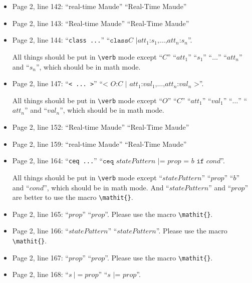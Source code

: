 \documentclass[12pt,onecolumn]{IEEEtranTIE}
\begin{document}
\begin{itemize}
\item Page 2, line 142: ``real-time Maude'' \by ``Real-Time Maude''

\item Page 2, line 143: ``Real-time Maude'' \by ``Real-Time Maude''

\item Page 2, line 144: ``\verb|class ...|'' \by ``$\texttt{class
}C\texttt{ |
}att_1\texttt{:}s_1\texttt{,}\ldots\texttt{,}att_n\texttt{:}s_n$''.

All things should be put in \verb|\verb| mode except ``$C$''
``$att_1$'' ``$s_1$'' ``$\ldots$'' ``$att_n$'' and ``$s_n$'', which
should be in math mode.

\item Page 2, line 147: ``\verb|< ... >|'' \by ``$\texttt{< }
  O\texttt{:} C \texttt{ | } att_1\texttt{:}val_1\texttt{,} \ldots
  \texttt{,}att_n\texttt{:}val_n\texttt{ >}$''. 

All things should be put in \verb|\verb| mode except ``$O$'' ``$C$''
``$att_1$'' ``$val_1$'' ``$\ldots$'' ``$att_n$'' and ``$val_n$'',
which should be in math mode.

\item Page 2, line 152: ``Real-time Maude'' \by ``Real-Time Maude''

\item Page 2, line 159: ``real-time Maude'' \by ``Real-Time Maude''

\item Page 2, line 164: ``\verb|ceq ...|'' \by ``$\texttt{ceq }
  \mathit{statePattern} \texttt{ |= } \mathit{prop} \texttt{ = } b
  \texttt{ if } cond$''.

All things should be put in \verb|\verb| mode except
``$\mathit{statePattern}$'' ``$\mathit{prop}$'' ``$b$'' and
``$cond$'', which should be in math mode. And ``$\mathit{statePattern}$''
and ``$\mathit{prop}$'' are better to use the macro \verb|\mathit{}|.

\item Page 2, line 165: ``$prop$'' \by ``$\mathit{prop}$''. Please use the
  macro \verb|\mathit{}|.

\item Page 2, line 166: ``$statePattern$'' \by
  ``$\mathit{statePattern}$''. Please use the macro \verb|\mathit{}|.

\item Page 2, line 167: ``$prop$'' \by ``$\mathit{prop}$''. Please use the
  macro \verb|\mathit{}|.

\item Page 2, line 168: ``$s~|= prop$'' \by ``$s \texttt{ |= }
  \mathit{prop}$''.


\end{itemize}
\end{document}
